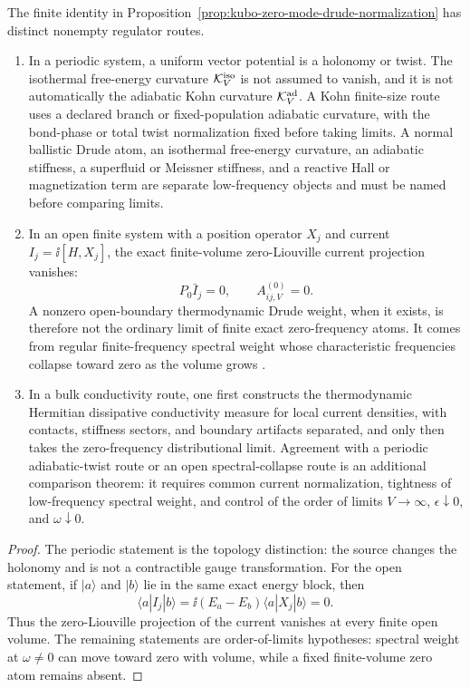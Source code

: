 \begin{proposition}
\label{prop:kubo-boundary-condition-drude-routes}
The finite identity in
Proposition~\ref{prop:kubo-zero-mode-drude-normalization} has distinct
nonempty regulator routes.
\begin{enumerate}
\item In a periodic system, a uniform vector potential is a holonomy or twist.
  The isothermal free-energy curvature \(\mathcal K^{\rm iso}_{V}\) is not
  assumed to vanish, and it is not automatically the adiabatic Kohn curvature
  \(\mathcal K^{\rm ad}_{V}\).  A Kohn finite-size route uses a declared
  branch or fixed-population adiabatic curvature, with the bond-phase or total
  twist normalization fixed before taking limits.  A normal ballistic Drude
  atom, an isothermal free-energy curvature, an adiabatic stiffness, a
  superfluid or Meissner stiffness, and a reactive Hall or magnetization term
  are separate low-frequency objects and must be named before comparing
  limits.
\item In an open finite system with a position operator \(X_j\) and current
  \(I_j=\ii[H,X_j]\), the exact finite-volume zero-Liouville current
  projection vanishes:
  \[
    P_0\bar I_j=0,\qquad A^{(0)}_{ij,V}=0 .
  \]
  A nonzero open-boundary thermodynamic Drude weight, when it exists, is
  therefore not the ordinary limit of finite exact zero-frequency atoms.  It
  comes from regular finite-frequency spectral weight whose characteristic
  frequencies collapse toward zero as the volume grows
  \cite{RigolShastry2008OpenDrude,BellomiaResta2020OpenDrude}.
\item In a bulk conductivity route, one first constructs the thermodynamic
  Hermitian dissipative conductivity measure for local current densities,
  with contacts, stiffness sectors, and boundary artifacts separated, and only
  then takes the zero-frequency distributional limit.  Agreement with a
  periodic adiabatic-twist route or an open spectral-collapse route is an
  additional comparison theorem: it requires common current normalization,
  tightness of low-frequency spectral weight, and control of the order of
  limits \(V\to\infty\), \(\epsilon\downarrow0\), and
  \(\omega\downarrow0\).
\end{enumerate}
\end{proposition}

\begin{proof}
The periodic statement is the topology distinction: the source changes the
holonomy and is not a contractible gauge transformation.  For the open
statement, if \(|a\rangle\) and \(|b\rangle\) lie in the same exact energy
block, then
\[
  \langle a|I_j|b\rangle
  =
  \ii(E_a-E_b)\langle a|X_j|b\rangle
  =
  0 .
\]
Thus the zero-Liouville projection of the current vanishes at every finite
open volume.  The remaining statements are order-of-limits hypotheses:
spectral weight at \(\omega\ne0\) can move toward zero with volume, while a
fixed finite-volume zero atom remains absent.
\end{proof}

